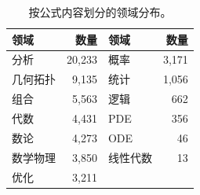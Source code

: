 \begin{table}[H]\centering\small\caption{按公式内容划分的领域分布。}\label{tab:domains}\begin{tabular}{lr@{\quad}lr}\toprule 领域&数量&领域&数量\\\midrule
分析 & 20,233 & 概率 & 3,171\\
几何拓扑 & 9,135 & 统计 & 1,056\\
组合 & 5,563 & 逻辑 & 662\\
代数 & 4,431 & PDE & 356\\
数论 & 4,273 & ODE & 46\\
数学物理 & 3,850 & 线性代数 & 13\\
优化 & 3,211 &  & \\
\bottomrule\end{tabular}\end{table}
